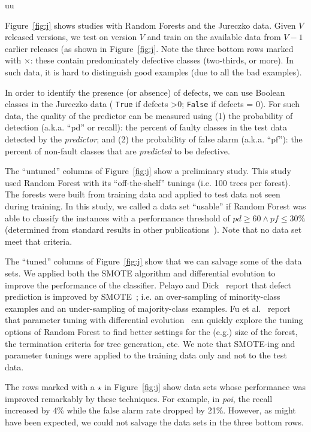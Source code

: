 uu \documentclass[final,twocolumn,5p]{elsarticle}
\newcommand{\fig}[1]{Figure~\ref{fig:#1}}
\theoremstyle{break}
\begin{document}
\begin{itemize}
\fig{j} shows   studies with Random Forests and
the Jureczko data. Given   $V$ released versions, we test on version $V$ and train on the available data from $V-1$ earlier releases (as shown in \fig{j}. Note the   \colorbox{lavenderpink}{three bottom rows}   marked with $\times$: these contain predominately defective classes (two-thirds, or more).  In such data, it is hard to distinguish good examples (due to all the bad examples). 

In order to identify the presence (or absence) of defects, we can   use Boolean classes in the  Jureczko data ( \texttt{True} if defects \textgreater 0; \texttt{False} if defects = 0). For such data, the quality of the predictor can be measured using (1) the  probability of detection (a.k.a. ``pd'' or recall):  the percent of faulty classes in the test data detected by the {\em predictor}; and (2) the  probability of false alarm (a.k.a. ``pf''): the percent of non-fault classes that are {\em predicted} to be defective.

The ``untuned'' columns of \fig{j}
show a preliminary study. This study used
Random Forest with its ``off-the-shelf'' tunings (i.e.  
100 trees per forest).  
The forests were built from training data and applied to test data
not seen during training.  In this
study, we called a data set ``usable'' if   Random Forest was able to classify the instances with a performance threshold of $\mathit{pd}\ge 60 \wedge \mathit{pf} \le 30$\% (determined from standard results in other publications~\cite{me07b}). Note that no  data set meet
that criteria.

The ``tuned'' columns of \fig{j} show that we can salvage some of the data sets. We applied both the SMOTE algorithm and differential evolution to improve the performance of the classifier. Pelayo and Dick~\cite{pelayo07} report that defect prediction is improved by SMOTE~\cite{Chawla2002}; i.e. an over-sampling of minority-class examples and an under-sampling of majority-class examples. Fu et al.~\cite{fu:ase15} report that parameter tuning with differential evolution~\cite{storn97} can quickly explore the tuning options of Random Forest to find better settings for the (e.g.) size of the forest, the termination criteria
for tree generation, etc. We note that SMOTE-ing and
parameter tunings were applied to the training data only and not to the test data.

The rows \colorbox{celadon}{marked with a $\star$} in \fig{j} show data sets whose performance was improved remarkably by these techniques. For example, in {\em poi}, the recall increased by 4\% while the false alarm rate dropped by 21\%. However, as might have been expected, we could not salvage the data sets in the  three bottom rows.


\end{itemize}
\end{document}
